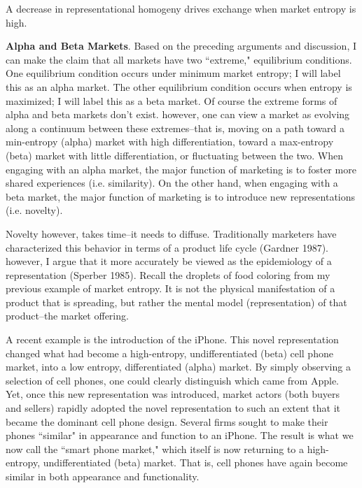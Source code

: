 \begin{prop}
A decrease in representational homogeny drives exchange when market entropy is high.
\end{prop}

\textbf{Alpha and Beta Markets}.
Based on the preceding arguments and discussion, I can make the claim that all markets have two ``extreme," equilibrium conditions. One equilibrium condition occurs under minimum market entropy; I will label this as an alpha market. The other equilibrium condition occurs when entropy is maximized; I will label this as a beta market. Of course the extreme forms of alpha and beta markets don't exist. however, one can view a market as evolving along a continuum between these extremes--that is, moving on a path toward a min-entropy (alpha) market with high differentiation, toward a max-entropy (beta) market with little differentiation, or fluctuating between the two. When engaging with an alpha market, the major function of marketing is to foster more shared experiences (i.e. similarity). On the other hand, when engaging with a beta market, the major function of marketing is to introduce new representations (i.e. novelty). 
 
Novelty however, takes time--it needs to diffuse. Traditionally marketers have characterized this behavior in terms of a product life cycle (Gardner 1987). however, I argue that it more accurately be viewed as the epidemiology of a representation (Sperber 1985). Recall the droplets of food coloring from my previous example of market entropy. It is not the physical manifestation of a product that is spreading, but rather the mental model (representation) of that product--the market offering. 

A recent example is the introduction of the iPhone. This novel representation changed what had become a high-entropy, undifferentiated (beta) cell phone market, into a low entropy, differentiated (alpha) market. By simply observing a selection of cell phones, one could clearly distinguish which came from Apple. Yet, once this new representation was introduced, market actors (both buyers and sellers) rapidly adopted the novel representation to such an extent that it became the dominant cell phone design. Several firms sought to make their phones ``similar" in appearance and function to an iPhone. The result is what we now call the ``smart phone market," which itself is now returning to a high-entropy, undifferentiated (beta) market. That is, cell phones have again become similar in both appearance and functionality.


